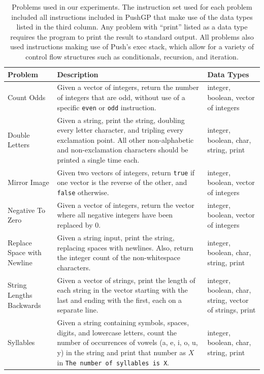 \documentclass{sig-alternate}
\begin{document}
\begin{table}[t]
	\centering
	\caption{Problems used in our experiments. The instruction set used for each problem included all instructions included in PushGP that make use of the data types listed in the third column. Any problem with ``print'' listed as a data type requires the program to print the result to standard output. All problems also used instructions making use of Push's exec stack, which allow for a variety of control flow structures such as conditionals, recursion, and iteration.}
	\label{table:problems}
	\begin{tabu} to \textwidth {X[1.1,l] X[5,l] X[2.1,l]}
		\toprule
		\textbf{Problem} & \textbf{Description}  & \textbf{Data Types} \\
		\midrule
		Count Odds                 & Given a vector of integers, return the number of integers that are odd, without use of a specific \texttt{even} or \texttt{odd} instruction. & integer, boolean, vector of integers \\
		Double Letters             & Given a string, print the string, doubling every letter character, and tripling every exclamation point. All other non-alphabetic and non-exclamation characters should be printed a single time each. & integer, boolean, char, string, print \\
		Mirror Image               & Given two vectors of integers, return \texttt{true} if one vector is the reverse of the other, and \texttt{false} otherwise. & integer, boolean, vector of integers \\
		Negative To Zero           & Given a vector of integers, return the vector where all negative integers have been replaced by 0. & integer, boolean, vector of integers \\
		Replace Space with Newline & Given a string input, print the string, replacing spaces with newlines. Also, return the integer count of the non-whitespace characters. & integer, boolean, char, string, print \\
		String Lengths Backwards   & Given a vector of strings, print the length of each string in the vector starting with the last and ending with the first, each on a separate line. & integer, boolean, char, string, vector of strings, print \\
		Syllables                  & Given a string containing symbols, spaces, digits, and lowercase letters, count the number of occurrences of vowels (a, e, i, o, u, y) in the string and print that number as $X$ in \texttt{The number of syllables is X}. & integer, boolean, char, string, print \\

\end{tabu}
\end{table}
\end{document}
